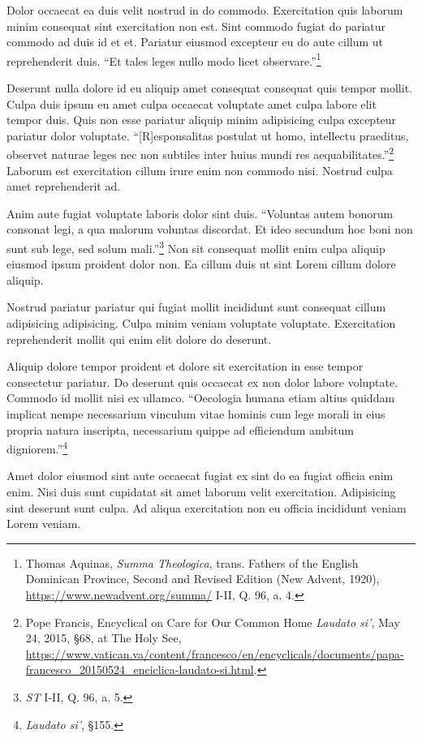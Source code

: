 \documentclass[
    12pt,
    letterpaper,
    oneside,
    noraggedright
]{turabian-researchpaper}
\begin{document}
Dolor occaecat ea duis velit nostrud in do commodo. Exercitation quis
laborum minim consequat sint exercitation non est. Sint commodo fugiat
do pariatur commodo ad duis id et et. Pariatur eiusmod excepteur eu do
aute cillum ut reprehenderit duis. ``Et tales leges nullo modo licet
observare.''\footnote{Thomas Aquinas, \emph{Summa Theologica}, trans.
  Fathers of the English Dominican Province, Second and Revised Edition
  (New Advent, 1920), \url{https://www.newadvent.org/summa/} I-II, Q.
  96, a. 4.}

Deserunt nulla dolore id eu aliquip amet consequat consequat quis tempor
mollit. Culpa duis ipsum eu amet culpa occaecat voluptate amet culpa
labore elit tempor duis. Quis non esse pariatur aliquip minim
adipisicing culpa excepteur pariatur dolor voluptate.
``{[}R{]}esponsalitas postulat ut homo, intellectu praeditus, observet
naturae leges nec non subtiles inter huius mundi res
aequabilitates.''\footnote{Pope Francis, {Encyclical on Care for Our
  Common Home \emph{Laudato si'},} May 24, 2015, §68, at The Holy See,
  \url{https://www.vatican.va/content/francesco/en/encyclicals/documents/papa-francesco_20150524_enciclica-laudato-si.html}.}
Laborum est exercitation cillum irure enim non commodo nisi. Nostrud
culpa amet reprehenderit ad.

Anim aute fugiat voluptate laboris dolor sint duis. ``Voluntas autem
bonorum consonat legi, a qua malorum voluntas discordat. Et ideo
secundum hoc boni non sunt sub lege, sed solum mali.''\footnote{\emph{ST}
  I-II, Q. 96, a. 5.} Non sit consequat mollit enim culpa aliquip
eiusmod ipsum proident dolor non. Ea cillum duis ut sint Lorem cillum
dolore aliquip.

Nostrud pariatur pariatur qui fugiat mollit incididunt sunt consequat
cillum adipisicing adipisicing. Culpa minim veniam voluptate voluptate.
Exercitation reprehenderit mollit qui enim elit dolore do deserunt.

Aliquip dolore tempor proident et dolore sit exercitation in esse tempor
consectetur pariatur. Do deserunt quis occaecat ex non dolor labore
voluptate. Commodo id mollit nisi ex ullamco. ``Oecologia humana etiam
altius quiddam implicat nempe necessarium vinculum vitae hominis cum
lege morali in eius propria natura inscripta, necessarium quippe ad
efficiendum ambitum digniorem.''\footnote{{\emph{Laudato si'},} §155.}

Amet dolor eiusmod sint aute occaecat fugiat ex sint do ea fugiat
officia enim enim. Nisi duis sunt cupidatat sit amet laborum velit
exercitation. Adipisicing sint deserunt sunt culpa. Ad aliqua
exercitation non eu officia incididunt veniam Lorem veniam.
\end{document}
